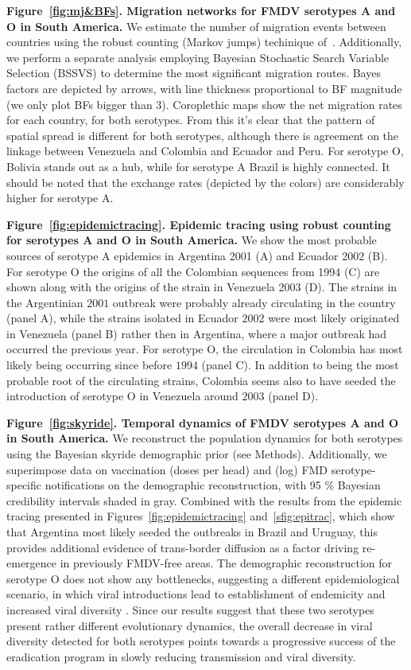 \documentclass[10pt]{article}
\begin{document}
{\bf Figure~\ref{fig:mj&BFs}. Migration networks for FMDV serotypes A and O in South America.} 
We estimate the number of migration events between countries using the robust counting (Markov jumps) techinique of~\cite{Minin2008}.
Additionally, we perform a separate analysis employing Bayesian Stochastic Search Variable Selection (BSSVS) to determine the most significant migration routes.
Bayes factors are depicted by arrows, with line thickness proportional to BF magnitude (we only plot BFs bigger than $3$).
Coroplethic maps show the net migration rates for each country, for both serotypes.
From this it's clear that the pattern of spatial spread is different for both serotypes, although there is agreement on the linkage between Venezuela and Colombia and Ecuador and Peru.
For serotype O, Bolivia stands out as a hub, while for serotype A Brazil is highly connected.
It should be noted that the exchange rates (depicted by the colors) are considerably higher for serotype A.

{\bf Figure~\ref{fig:epidemictracing}. Epidemic tracing using robust counting for serotypes A and O in South America.} 
We show the most probable sources of serotype A epidemics in Argentina 2001 (A) and Ecuador 2002 (B).
For serotype O the origins of all the Colombian sequences from 1994 (C) are shown along with the origins of the strain in Venezuela 2003 (D).
The strains in the Argentinian $2001$ outbreak were probably already circulating in the country (panel A), while the strains isolated in Ecuador $2002$ were most likely originated in Venezuela (panel B) rather then in Argentina, where a major outbreak had occurred the previous year.
For serotype O, the circulation in Colombia has most likely being occurring since before $1994$ (panel C).
In addition to being the most probable root of the circulating strains, Colombia seems also to have seeded the introduction of serotype O in Venezuela around $2003$ (panel D).

{\bf Figure~\ref{fig:skyride}. Temporal dynamics of FMDV serotypes A and O in South America.} 
We reconstruct the population dynamics for both serotypes using the Bayesian skyride demographic prior (see Methods).
Additionally, we superimpose data on vaccination (doses per head) and (log) FMD serotype-specific notifications on the demographic reconstruction, with 95 \% Bayesian credibility intervals shaded in gray.
Combined with the results from the epidemic tracing presented in Figures~\ref{fig:epidemictracing} and~\ref{sfig:epitrac}, which show that Argentina most likely seeded the outbreaks in Brazil and Uruguay, this provides additional evidence of trans-border diffusion as a factor driving re-emergence in previously FMDV-free areas.
The demographic reconstruction for serotype O does not show any bottlenecks, suggesting a different epidemiological scenario, in which viral introductions lead to establishment of endemicity and increased viral diversity .
Since our results suggest that these two serotypes present rather different evolutionary dynamics, the overall decrease in viral diversity detected for both serotypes points towards a progressive success of the eradication program in slowly reducing transmission and viral diversity.
\end{document}
